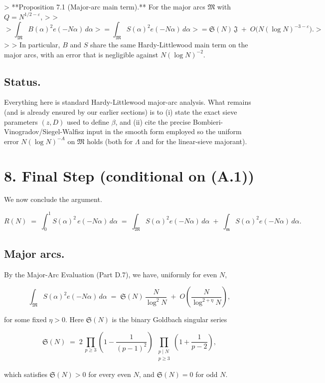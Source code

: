 \documentclass[11pt]{article}
\theoremstyle{definition}
\theoremstyle{remark}
\begin{document}
> **Proposition 7.1 (Major-arc main term).** For the major arcs $\mathfrak M$ with $Q=N^{1/2-\varepsilon}$,
>
> $$
	> \int_{\mathfrak M} B(\alpha)^2 e(-N\alpha)\,d\alpha
	> =\int_{\mathfrak M} S(\alpha)^2 e(-N\alpha)\,d\alpha
	> =\mathfrak S(N)\,\mathfrak J\;+\;O\!\big(N(\log N)^{-3-\varepsilon}\big).
	> $$
>
> In particular, $B$ and $S$ share the same Hardy-Littlewood main term on the major arcs, with an error that is negligible against $N(\log N)^{-2}$.

\subsection*{Status.}
Everything here is standard Hardy-Littlewood major-arc analysis. What remains (and is already ensured by our earlier sections) is to (i) state the exact sieve parameters $(z,D)$ used to define $\beta$, and (ii) cite the precise Bombieri-Vinogradov/Siegel-Walfisz input in the smooth form employed so the uniform error $N(\log N)^{-A}$ on $\mathfrak M$ holds (both for $\Lambda$ and for the linear-sieve majorant).
\section*{8. Final Step (conditional on (A.1))}

We now conclude the argument.

$$
	R(N)\;=\;\int_0^1 S(\alpha)^2\,e(-N\alpha)\,d\alpha
	\;=\;\int_{\mathfrak M} S(\alpha)^2 e(-N\alpha)\,d\alpha
	\;+\;\int_{\mathfrak m} S(\alpha)^2 e(-N\alpha)\,d\alpha.
$$

\subsection*{Major arcs.}

By the Major-Arc Evaluation (Part D.7), we have, uniformly for even $N$,

$$
	\int_{\mathfrak M} S(\alpha)^2 e(-N\alpha)\,d\alpha
	\;=\;\mathfrak S(N)\,\frac{N}{\log^2 N}\;+\;O\!\left(\frac{N}{\log^{2+\eta}N}\right),
$$

for some fixed $\eta>0$. Here $\mathfrak S(N)$ is the binary Goldbach singular series

$$
	\mathfrak S(N)
	\;=\;2\,\prod_{p\ge 3}\!\left(1-\frac{1}{(p-1)^2}\right)
	\;\prod_{\substack{p\mid N\\ p\ge 3}}\!\!\left(1+\frac{1}{p-2}\right),
$$

which satisfies $\mathfrak S(N)>0$ for every even $N$, and $\mathfrak S(N)=0$ for odd $N$.
\end{document}

